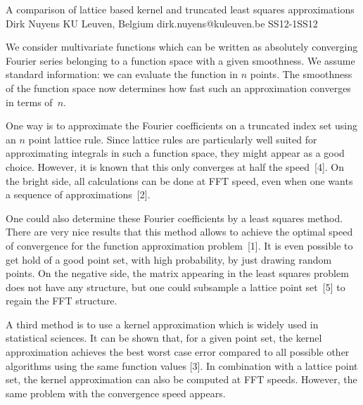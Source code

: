\begin{talk}
  {A comparison of lattice based kernel and truncated least squares approximations}%
  {Dirk Nuyens}%
  {KU Leuven, Belgium}%
  {dirk.nuyens@kuleuven.be}%
  {}%
{}{}{SS12-1}{SS12}

			
We consider multivariate functions which can be written as absolutely converging Fourier series belonging to a function space with a given smoothness. We assume standard information: we can evaluate the function in $n$ points. The smoothness of the function space now determines how fast such an approximation converges in terms of~$n$.

One way is to approximate the Fourier coefficients on a truncated index set using an $n$ point lattice rule. Since lattice rules are particularly well suited for approximating integrals in such a function space, they might appear as a good choice. However, it is known that this only converges at half the speed~[4]. On the bright side, all calculations can be done at FFT speed, even when one wants a sequence of approximations~[2].

One could also determine these Fourier coefficients by a least squares method. There are very nice results that this method allows to achieve the optimal speed of convergence for the function approximation problem~[1]. It is even possible to get hold of a good point set, with high probability, by just drawing random points. On the negative side, the matrix appearing in the least squares problem does not have any structure, but one could subsample a lattice point set~[5] to regain the FFT structure.

A third method is to use a kernel approximation which is widely used in statistical sciences. It can be shown that, for a given point set, the kernel approximation achieves the best worst case error compared to all possible other algorithms using the same function values [3]. In combination with a lattice point set, the kernel approximation can also be computed at FFT speeds. However, the same problem with the convergence speed appears.


\end{talk}
